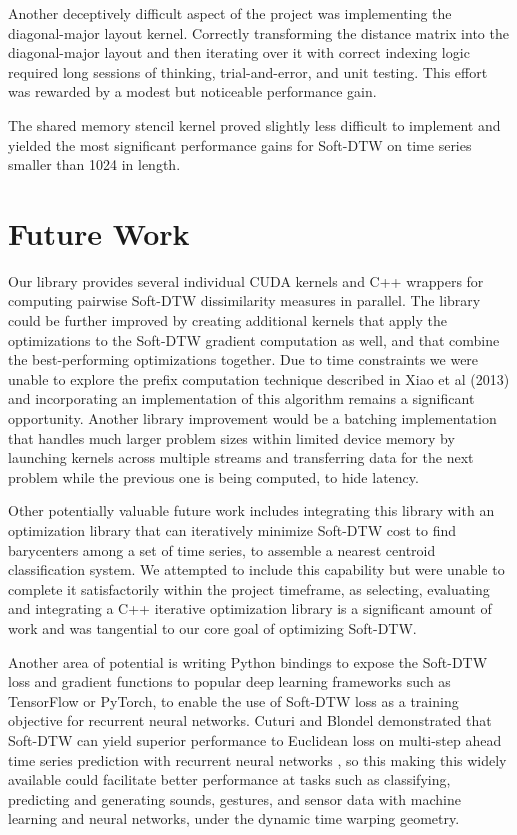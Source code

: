 \documentclass[12pt, letterpaper]{article}
\begin{document}
Another deceptively difficult aspect of the project was implementing the
diagonal-major layout kernel. Correctly transforming the distance matrix into
the diagonal-major layout and then iterating over it with correct indexing logic
required long sessions of thinking, trial-and-error, and unit testing. This
effort was rewarded by a modest but noticeable performance gain.

The shared memory stencil kernel proved slightly less difficult to implement and
yielded the most significant performance gains for Soft-DTW on time series
smaller than 1024 in length.

\section{Future Work}

Our library provides several individual CUDA kernels and C++ wrappers for
computing pairwise Soft-DTW dissimilarity measures in parallel. The library
could be further improved by creating additional kernels that apply the
optimizations to the Soft-DTW gradient computation as well, and that combine the
best-performing optimizations together. Due to time constraints we were unable
to explore the prefix computation technique described in Xiao et al (2013)
\cite{xiao_parallelizing_2013} and incorporating an implementation of this
algorithm remains a significant opportunity. Another library improvement would
be a batching implementation that handles much larger problem sizes within
limited device memory by launching kernels across multiple streams and
transferring data for the next problem while the previous one is being computed,
to hide latency.

Other potentially valuable future work includes integrating this library with an
optimization library that can iteratively minimize Soft-DTW cost to find
barycenters among a set of time series, to assemble a nearest centroid
classification system. We attempted to include this capability but were unable
to complete it satisfactorily within the project timeframe, as selecting,
evaluating and integrating a C++ iterative optimization library is a significant
amount of work and was tangential to our core goal of optimizing Soft-DTW.

Another area of potential is writing Python bindings to expose the Soft-DTW loss
and gradient functions to popular deep learning frameworks such as TensorFlow or
PyTorch, to enable the use of Soft-DTW loss as a training objective for
recurrent neural networks. Cuturi and Blondel demonstrated that Soft-DTW can
yield superior performance to Euclidean loss on multi-step ahead time series
prediction with recurrent neural networks \cite{cuturi_soft-dtw_2018}, so this
making this widely available could facilitate better performance at tasks such
as classifying, predicting and generating sounds, gestures, and sensor data with
machine learning and neural networks, under the dynamic time warping geometry.

\printbibliography[]
\end{document}

